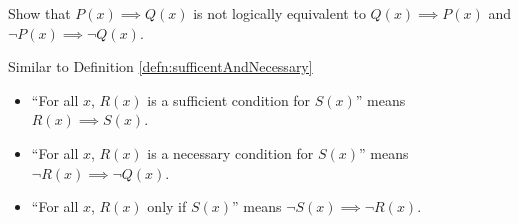 \begin{exercise}
  Show that $P(x)\implies Q(x)$ is not logically equivalent to $Q(x)\implies P(x)$ and $\neg P(x)\implies \neg Q(x)$.
\end{exercise}

Similar to Definition \ref{defn:sufficentAndNecessary}
\begin{itemize}
  \item ``For all $x$, $R(x)$ is a sufficient condition for $S(x)$'' means $R(x)\implies S(x)$.
  \item ``For all $x$, $R(x)$ is a necessary condition for $S(x)$'' means $\neg R(x)\implies \neg Q(x)$.
  \item ``For all $x$, $R(x)$ only if $S(x)$'' means $\neg S(x)\implies \neg R(x)$.
\end{itemize}





